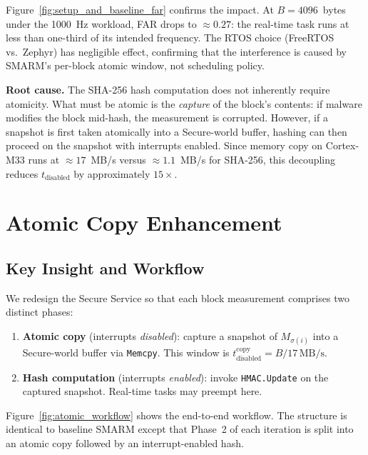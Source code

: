 \documentclass[conference]{IEEEtran}
\newcommand{\smarm}{SMARM\xspace}
\newcommand{\tdis}{$t_{\mathrm{disabled}}$\xspace}
\begin{document}
Figure~\ref{fig:setup_and_baseline_far} confirms the impact. At
$B = 4096$~bytes under the 1000~Hz workload, FAR drops to
$\approx 0.27$: the real-time task runs at less than one-third
of its intended frequency. The RTOS choice (FreeRTOS vs.\ Zephyr)
has negligible effect, confirming that the interference is caused
by \smarm's per-block atomic window, not scheduling policy.

\textbf{Root cause.} The SHA-256 hash computation does not
inherently require atomicity. What must be atomic is the
\emph{capture} of the block's contents: if malware modifies the
block mid-hash, the measurement is corrupted. However, if a
snapshot is first taken atomically into a Secure-world buffer,
hashing can then proceed on the snapshot with interrupts enabled.
Since memory copy on Cortex-M33 runs at $\approx 17$~MB/s versus
$\approx 1.1$~MB/s for SHA-256, this decoupling reduces \tdis
by approximately $15\times$.

\section{Atomic Copy Enhancement}
\label{sec:design}
 
\subsection{Key Insight and Workflow}
 
We redesign the Secure Service so that each block measurement
comprises two distinct phases:
\begin{enumerate}
  \item \textbf{Atomic copy} (interrupts \emph{disabled}):
    capture a snapshot of $M_{\sigma(i)}$ into a Secure-world
    buffer via \texttt{Memcpy}. This window is
    $t_{\mathrm{disabled}}^{\mathrm{copy}} = B /
    17\,\text{MB/s}$.
  \item \textbf{Hash computation} (interrupts \emph{enabled}):
    invoke \texttt{HMAC.Update} on the captured snapshot.
    Real-time tasks may preempt here.
\end{enumerate}
 
Figure~\ref{fig:atomic_workflow} shows the end-to-end workflow.
The structure is identical to baseline SMARM except that
Phase~2 of each iteration is split into an atomic copy followed
by an interrupt-enabled hash.
 
\end{document}
